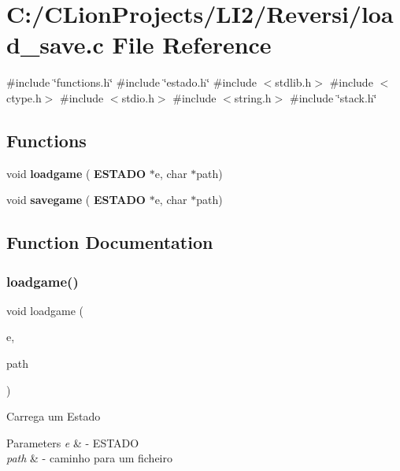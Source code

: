 \section{C\+:/\+C\+Lion\+Projects/\+L\+I2/\+Reversi/load\+\_\+save.c File Reference}
\label{load__save_8c}
{\ttfamily \#include \char`\"{}functions.\+h\char`\"{}}\newline
{\ttfamily \#include \char`\"{}estado.\+h\char`\"{}}\newline
{\ttfamily \#include $<$stdlib.\+h$>$}\newline
{\ttfamily \#include $<$ctype.\+h$>$}\newline
{\ttfamily \#include $<$stdio.\+h$>$}\newline
{\ttfamily \#include $<$string.\+h$>$}\newline
{\ttfamily \#include \char`\"{}stack.\+h\char`\"{}}\newline
\subsection*{Functions}
\begin{DoxyCompactItemize}
\item 
void \textbf{ loadgame} (\textbf{ E\+S\+T\+A\+DO} $\ast$e, char $\ast$path)
\item 
void \textbf{ savegame} (\textbf{ E\+S\+T\+A\+DO} $\ast$e, char $\ast$path)
\end{DoxyCompactItemize}


\subsection{Function Documentation}
\mbox{\label{load__save_8c_a0daf61186845aff72b41fbcabce18b17}} 
\subsubsection{loadgame()}
{\footnotesize\ttfamily void loadgame (\begin{DoxyParamCaption}\item[{\textbf{ E\+S\+T\+A\+DO} $\ast$}]{e,  }\item[{char $\ast$}]{path }\end{DoxyParamCaption})}

Carrega um Estado 
\begin{DoxyParams}{Parameters}
{\em e} & -\/ E\+S\+T\+A\+DO \\
\hline
{\em path} & -\/ caminho para um ficheiro \\
\hline
\end{DoxyParams}
\mbox{\label{load__save_8c_a1d2d86ab8a461942725cf959abd7378b}} 
